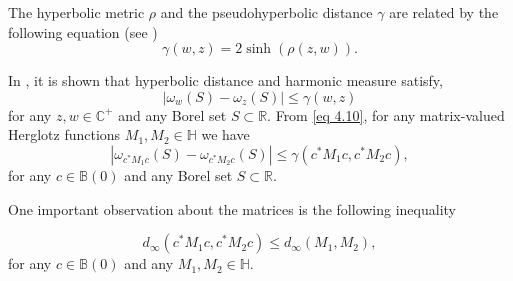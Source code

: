 \documentclass[reqno]{amsart}
\numberwithin{equation}{section}
\newcommand{\C}{\mathbb{C}}
\newcommand{\R}{\mathbb{R}}
\begin{document}
The hyperbolic metric $\rho $ and the pseudohyperbolic distance $\gamma$ are related by the following equation (see \cite{BP2})
\begin{equation}\gamma(w,z) =2 \sinh(\rho(z, w)) .\end{equation}

In \cite {CR1}, it is shown that hyperbolic distance and harmonic measure satisfy,
\begin{equation}\label{eq 4.10}|\omega_{w}(S)-\omega_{z}(S)|\leq \gamma(w,z)\end{equation} for any $z,w \in \C^+ $ and any Borel set $S\subset\R.$ 
 From \eqref{eq 4.10}, for any matrix-valued Herglotz functions $ M_1 , M_2 \in \mathbb H$ we have
 \begin{equation} \label{eq 4.11}
 |\omega_{c^* M_1 c}(S)-\omega_{c^*M_2c}(S)|\leq \gamma(c^*M_1c,c^*M_2 c),
 \end{equation} for any $c \in \mathbb B(0)$ and any Borel set $S\subset\R.$ 
 
 One important observation about the matrices is the following inequality
 
 \begin{equation} \label{eq 4.11'}
 d_{\infty}(c^*M_1c,c^*M_2 c) \leq d_{\infty}(M_1, M_2 ),
 \end{equation} 
 for any $c \in \mathbb B(0)$ and any   $ M_1, M_2 \in \mathbb H.$ 
 
 
 
\end{document}
